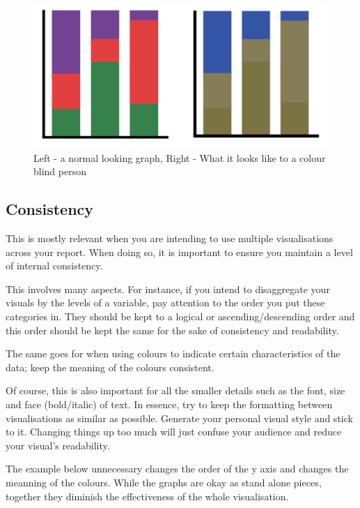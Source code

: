 \documentclass[
]{book}
\begin{document}
\begin{figure}
\centering
\includegraphics{img/colour blind comine.png}
\caption{Left - a normal looking graph, Right - What it looks like to a colour blind person}
\end{figure}

\hypertarget{consistency}{%
\subsection{Consistency}\label{consistency}}

This is mostly relevant when you are intending to use multiple visualisations across your report. When doing so, it is important to ensure you maintain a level of internal consistency.

This involves many aspects. For instance, if you intend to disaggregate your visuals by the levels of a variable, pay attention to the order you put these categories in. They should be kept to a logical or ascending/descending order and this order should be kept the same for the sake of consistency and readability.

The same goes for when using colours to indicate certain characteristics of the data; keep the meaning of the colours consistent.

Of course, this is also important for all the smaller details such as the font, size and face (bold/italic) of text. In essence, try to keep the formatting between visualisations as similar as possible. Generate your personal visual style and stick to it. Changing things up too much will just confuse your audience and reduce your visual's readability.

The example below unnecessary changes the order of the y axis and changes the meanning of the colours. While the graphs are okay as stand alone pieces, together they diminish the effectiveness of the whole visualisation.
\end{document}
